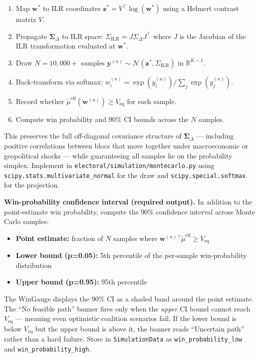 \documentclass[11pt]{article}
\newcommand{\veq}{V_{\mathrm{eq}}}
\newcommand{\boldSigma}{\boldsymbol{\Sigma}}
\begin{document}
\begin{enumerate}[leftmargin=2em, itemsep=2pt]
  \item Map $\mathbf{w}^*$ to ILR coordinates $\mathbf{z}^* = V^\top\log(\mathbf{w}^*)$
        using a Helmert contrast matrix $V$.
  \item Propagate $\boldSigma_\Delta$ to ILR space: $\Sigma_{\text{ILR}} = J \Sigma_\Delta J^\top$
        where $J$ is the Jacobian of the ILR transformation evaluated at $\mathbf{w}^*$.
  \item Draw $N = 10{,}000+$ samples
        $\mathbf{y}^{(n)} \sim \mathcal{N}(\mathbf{z}^*, \Sigma_{\text{ILR}})$
        in $\mathbb{R}^{K-1}$.
  \item Back-transform via softmax:
        $w_i^{(n)} = \exp(y_i^{(n)}) / \sum_j \exp(y_j^{(n)})$.
  \item Record whether $\tilde{\mu}^{\text{eff}}(\mathbf{w}^{(n)}) \geq \veq$ for each sample.
  \item Compute win probability and 90\% CI bounds across the $N$ samples.
\end{enumerate}

This preserves the full off-diagonal covariance structure of $\boldSigma_\Delta$ ---
including positive correlations between blocs that move together under macroeconomic
or geopolitical shocks --- while guaranteeing all samples lie on the probability
simplex. Implement in \texttt{electoral/simulation/montecarlo.py} using
\texttt{scipy.stats.multivariate\_normal} for the draw and \texttt{scipy.special.softmax}
for the projection.

\textbf{Win-probability confidence interval (required output).}
In addition to the point-estimate win probability, compute the 90\% confidence
interval across Monte Carlo samples:
\begin{itemize}[leftmargin=1.6em, itemsep=2pt]
  \item \textbf{Point estimate:} fraction of $N$ samples where
        $\mathbf{w}^{(n)\top}\tilde{\mu}^{\text{eff}} \geq \veq$
  \item \textbf{Lower bound (p=0.05):} 5th percentile of the per-sample
        win-probability distribution
  \item \textbf{Upper bound (p=0.95):} 95th percentile
\end{itemize}
The WinGauge displays the 90\% CI as a shaded band around the point estimate.
The ``No feasible path'' banner fires only when the \emph{upper} CI bound
cannot reach $\veq$ --- meaning even optimistic coalition scenarios fail.
If the lower bound is below $\veq$ but the upper bound is above it, the
banner reads ``Uncertain path'' rather than a hard failure. Store in
\texttt{SimulationData} as \texttt{win\_probability\_low} and
\texttt{win\_probability\_high}.
\end{document}
